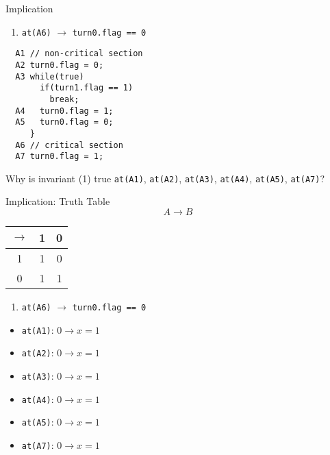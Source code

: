 \begin{frame}[fragile]{Implication}
  \begin{enumerate}
  \item \lstinline!at(A6)! $\rightarrow$ \lstinline!turn0.flag == 0!
  \end{enumerate}


\begin{lstlisting}
  A1 // non-critical section
  A2 turn0.flag = 0;
  A3 while(true)
       if(turn1.flag == 1) 
         break;
  A4   turn0.flag = 1;
  A5   turn0.flag = 0;
     }
  A6 // critical section
  A7 turn0.flag = 1;
\end{lstlisting}


  Why is invariant (1) true \lstinline!at(A1)!, \lstinline!at(A2)!,
  \lstinline!at(A3)!, \lstinline!at(A4)!, \lstinline!at(A5)!,
  \lstinline!at(A7)!?
\end{frame}

\begin{frame}{Implication: Truth Table}
  $$A \rightarrow B$$


  \begin{center}
    \begin{tabular}{|c|c c|}
      \hline
      $\rightarrow$ & 1 & 0 \\\hline
      1 & 1 & 0 \\
      0 & 1 & 1 \\\hline
    \end{tabular}
  \end{center}


  \begin{enumerate}
  \item \lstinline!at(A6)! $\rightarrow$ \lstinline!turn0.flag == 0!
  \end{enumerate}


  \begin{itemize}
  \item \lstinline!at(A1)!: $0 \rightarrow x = 1$
  \item \lstinline!at(A2)!: $0 \rightarrow x = 1$
  \item \lstinline!at(A3)!: $0 \rightarrow x = 1$
  \item \lstinline!at(A4)!: $0 \rightarrow x = 1$
  \item \lstinline!at(A5)!: $0 \rightarrow x = 1$
  \item \lstinline!at(A7)!: $0 \rightarrow x = 1$
  \end{itemize}
\end{frame}

